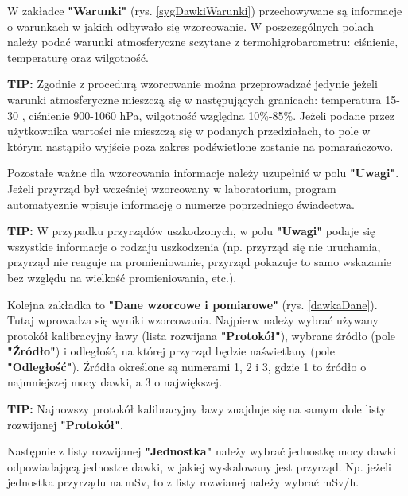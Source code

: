 	W zakładce \textbf{"Warunki"} (rys. \ref{sygDawkiWarunki}) przechowywane są informacje o warunkach w jakich odbywało się wzorcowanie. W poszczególnych polach należy podać warunki atmosferyczne sczytane z termohigrobarometru: ciśnienie, temperaturę oraz wilgotność.

\textbf{TIP:} Zgodnie z procedurą wzorcowanie można przeprowadzać jedynie jeżeli warunki atmosferyczne mieszczą się w następujących granicach: temperatura 15-30 \textcelsius, ciśnienie 900-1060 hPa,  wilgotność względna 10\%-85\%. Jeżeli podane przez użytkownika wartości nie mieszczą się w podanych przedziałach, to pole w którym nastąpiło wyjście poza zakres podświetlone zostanie na pomarańczowo.

	Pozostałe ważne dla wzorcowania informacje należy uzupełnić w polu \textbf{"Uwagi"}. Jeżeli przyrząd był wcześniej wzorcowany w laboratorium, program automatycznie wpisuje informację o numerze poprzedniego świadectwa. 
	
	\textbf{TIP:} W przypadku przyrządów uszkodzonych, w polu \textbf{"Uwagi"} podaje się wszystkie informacje o rodzaju uszkodzenia (np. przyrząd się nie uruchamia, przyrząd nie reaguje na promieniowanie, przyrząd pokazuje to samo wskazanie bez względu na wielkość promieniowania, etc.).
	
	Kolejna zakładka to \textbf{"Dane wzorcowe i pomiarowe"} (rys. \ref{dawkaDane}). Tutaj wprowadza się wyniki wzorcowania. Najpierw należy wybrać używany protokół kalibracyjny ławy (lista rozwijana \textbf{"Protokół"}), wybrane źródło (pole \textbf{"Źródło"}) i odległość, na której przyrząd będzie naświetlany (pole \textbf{"Odległość"}). Źródła określone są numerami 1, 2 i 3, gdzie 1 to źródło o najmniejszej mocy dawki, a 3 o największej.
	
	\textbf{TIP:} Najnowszy protokół kalibracyjny ławy znajduje się na samym dole listy rozwijanej \textbf{"Protokół"}.
	
	Następnie z listy rozwijanej \textbf{"Jednostka"} należy wybrać jednostkę mocy dawki odpowiadającą jednostce dawki, w jakiej wyskalowany jest przyrząd. Np. jeżeli jednostka przyrządu na mSv, to z listy rozwianej należy wybrać mSv/h.
	
